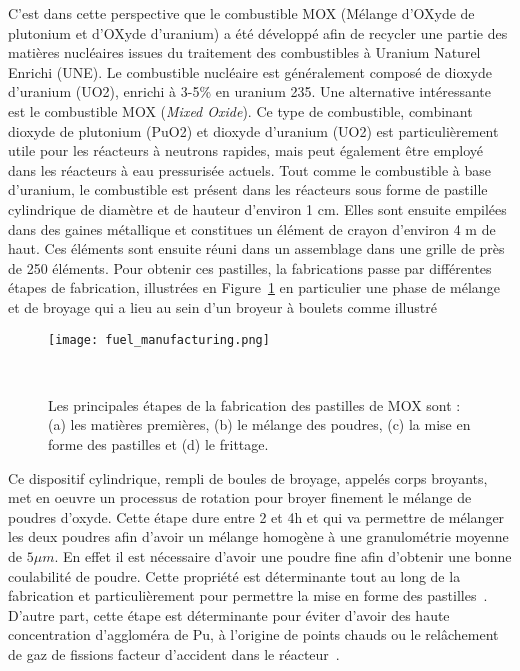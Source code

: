C'est dans cette perspective que le combustible MOX (Mélange d’OXyde de plutonium et d’OXyde d’uranium) a été développé afin de recycler une partie des matières nucléaires issues du traitement des combustibles à Uranium Naturel Enrichi (UNE). Le combustible nucléaire est généralement composé de dioxyde d'uranium (UO2), enrichi à 3-5\% en uranium 235. Une alternative intéressante est le combustible MOX (\textit{Mixed Oxide}). Ce type de combustible, combinant dioxyde de plutonium (PuO2) et dioxyde d'uranium (UO2) est particulièrement utile pour les réacteurs à neutrons rapides, mais peut également être employé dans les réacteurs à eau pressurisée actuels.
Tout comme le combustible à base d'uranium, le combustible est présent dans les réacteurs sous forme de pastille cylindrique de diamètre et de hauteur d'environ 1 cm. Elles sont ensuite empilées dans des gaines métallique et constitues un élément de crayon d'environ 4 m de haut. Ces éléments sont ensuite réuni dans un assemblage dans une grille de près de 250 éléments. Pour obtenir ces pastilles, la fabrications passe par différentes étapes de fabrication, illustrées en Figure~\ref{fig:fab_comb} en particulier une phase de mélange et de broyage qui a lieu au sein d'un broyeur à boulets comme illustré

\begin{figure}[h]
    \centering
    \texttt{[image: fuel\_manufacturing.png]}
    \caption{Les principales étapes de la fabrication des pastilles de MOX sont : (a) les matières premières, (b) le mélange des poudres, (c) la mise en forme des pastilles et (d) le frittage.}~\label{fig:fab_comb}
\end{figure}

Ce dispositif cylindrique, rempli de boules de broyage, appelés corps broyants, met en oeuvre un processus de rotation pour broyer finement le mélange de poudres d'oxyde. Cette étape dure entre 2 et 4h et qui va permettre de mélanger les deux poudres afin d'avoir un mélange homogène à une granulométrie moyenne de $5\mu m$. En effet il est nécessaire d'avoir une poudre fine afin d'obtenir une bonne coulabilité de poudre. Cette propriété est déterminante tout au long de la fabrication et particulièrement pour permettre la mise en forme des pastilles~\cite{ABE2012393}. D'autre part, cette étape est déterminante pour éviter d'avoir des haute concentration d'aggloméra de Pu, à l'origine de points chauds ou le relâchement de gaz de fissions facteur d'accident dans le réacteur~\cite{BOULORE201579, oudinet2015}.

